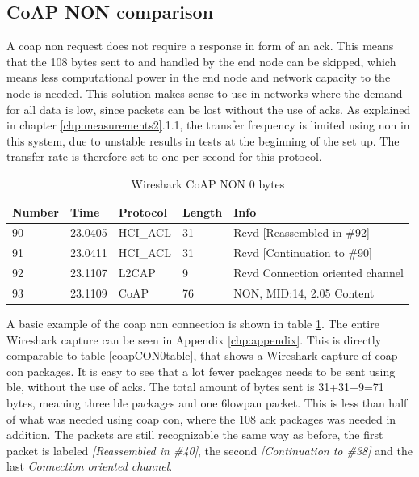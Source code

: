 \subsection{CoAP NON comparison}

A \gls{coap} \gls{non} request does not require a response in form of an \gls{ack}. This means that the 108 bytes sent to and handled by the end node can be skipped, which means less computational power in the end node and network capacity to the node is needed. This solution makes sense to use in networks where the demand for all data is low, since packets can be lost without the use of \glspl{ack}. As explained in chapter \ref{chp:measurements2}.1.1, the transfer frequency is limited using \gls{non} in this system, due to unstable results in tests at the beginning of the set up. The transfer rate is therefore set to one per second for this protocol. 


\begin{table}[ht]
\small
\centering
\caption{Wireshark CoAP NON 0 bytes}
\label{coapNON0table}
\begin{tabular}{lllll}
\hline
Number & Time    & Protocol & Length & Info                             \\ \hline
90     & 23.0405 & HCI\_ACL & 31     & Rcvd {[}Reassembled in \#92{]}   \\
91     & 23.0411 & HCI\_ACL & 31     & Rcvd {[}Continuation to \#90{]}  \\
92     & 23.1107 & L2CAP    & 9      & Rcvd Connection oriented channel \\
93     & 23.1109 & CoAP     & 76     & NON, MID:14, 2.05 Content        \\ \hline
\end{tabular}
\end{table}


A basic example of the \gls{coap} \gls{non} connection is shown in table \ref{coapNON0table}. The entire Wireshark capture can be seen in Appendix \ref{chp:appendix}. This is directly comparable to table \ref{coapCON0table}, that shows a Wireshark capture of \gls{coap} \gls{con} packages. It is easy to see that a lot fewer packages needs to be sent using \gls{ble}, without the use of \glspl{ack}. The total amount of bytes sent is 31+31+9=71 bytes, meaning three \gls{ble} packages and one \gls{6lowpan} packet. This is less than half of what was needed using \gls{coap} \gls{con}, where the 108 \gls{ack} packages was needed in addition. The packets are still recognizable the same way as before, the first packet is labeled \textit{[Reassembled in \#40]}, the second \textit{[Continuation to \#38]} and the last \textit{Connection oriented channel}.

